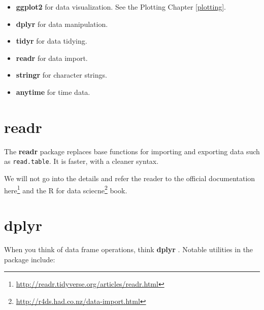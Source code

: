 \documentclass[]{book}
\providecommand{\tightlist}{%
  \setlength{\itemsep}{0pt}\setlength{\parskip}{0pt}}
\renewcommand{\href}[2]{#2\footnote{\url{#1}}}
\theoremstyle{definition}
\theoremstyle{definition}
\theoremstyle{definition}
\theoremstyle{remark}
\begin{document}
\begin{itemize}
\tightlist
\item
  \textbf{ggplot2} for data visualization. See the Plotting Chapter \ref{plotting}.
\item
  \textbf{dplyr} for data manipulation.
\item
  \textbf{tidyr} for data tidying.
\item
  \textbf{readr} for data import.
\item
  \textbf{stringr} for character strings.
\item
  \textbf{anytime} for time data.
\end{itemize}

\hypertarget{readr}{%
\section{readr}\label{readr}}

The \textbf{readr} package \citep{readr} replaces base functions for importing and exporting data such as \texttt{read.table}.
It is faster, with a cleaner syntax.

We will not go into the details and refer the reader to the official documentation \href{http://readr.tidyverse.org/articles/readr.html}{here} and the \href{http://r4ds.had.co.nz/data-import.html}{R for data sciecne} book.

\hypertarget{dplyr}{%
\section{dplyr}\label{dplyr}}

When you think of data frame operations, think \textbf{dplyr} \citep{dplyr}.
Notable utilities in the package include:
\end{document}

